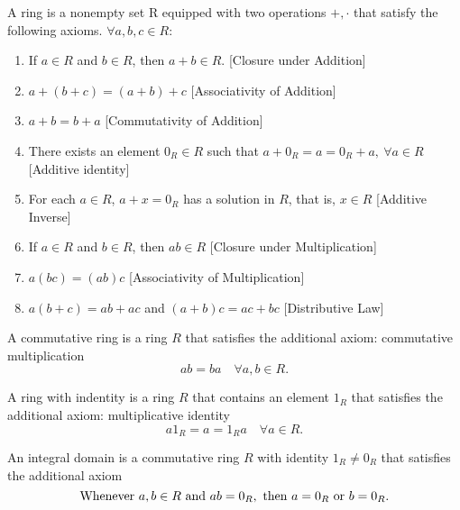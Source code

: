 \documentclass[../main.tex]{subfiles}
\begin{document}
\begin{definition}[Ring]\label{def:ring}
A ring is a nonempty set R equipped with two operations \(+, \cdot\) that satisfy the following axioms. \(\forall a,b,c \in R\):
\begin{enumerate}
    \item If \(a \in R\) and \(b \in R\), then \(a + b \in R\). \hfill [Closure under Addition]
    \item \(a + (b+c) = (a+b)+c\) \hfill [Associativity of Addition]
    \item \(a + b = b + a\) \hfill [Commutativity of Addition]
    \item There exists an element \( 0_R \in R\) such that \(a + 0_R = a = 0_R + a, \ \forall a \in R\) \hfill [Additive identity]
    \item For each \(a \in R\), \(a + x = 0_R\) has a solution in \(R\), that is, \(x \in R\) \hfill [Additive Inverse]
    \item If \(a \in R\) and \(b \in R\), then \(ab \in R\) \hfill [Closure under Multiplication]
    \item \(a(bc) = (ab)c\) \hfill [Associativity of Multiplication]
    \item \( a(b+c) = ab + ac\) and \((a+b)c = ac + bc\) \hfill [Distributive Law]
\end{enumerate}

\end{definition}


\begin{definition}\label{def:commutative_ring}
A commutative ring is a ring \(R\) that satisfies the additional axiom: commutative multiplication
\[
ab = ba \quad \forall a,b \in R.
\]
\end{definition}

\begin{definition}
A ring with indentity is a ring \(R\) that contains an element \(1_R\) that satisfies the additional axiom: multiplicative identity
\[
a1_R = a = 1_R a \quad \forall a \in R.
\]
\end{definition}

\begin{definition}
An integral domain is a commutative ring \(R\) with identity \(1_R \neq 0_R\) that satisfies the additional axiom
\[
\textnormal{Whenever } a,b \in R \textnormal{ and } ab = 0_R, \textnormal{ then } a = 0_R \textnormal{ or } b = 0_R.
\]
    
\end{definition}
\end{document}
